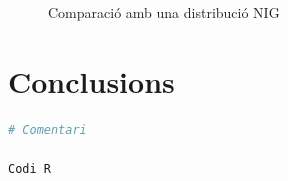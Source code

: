 \documentclass{article}
\numberwithin{table}{section}
\numberwithin{figure}{section}
\numberwithin{equation}{section}
\begin{document}
\begin{figure}[H]
	\centering \sffamily \small
	
	\caption{Comparació amb una distribució NIG}
	\label{fig:comparacio nig}
\end{figure}


\section{Conclusions}
\newpage







\begin{lstlisting}[language=R]
# Comentari

Codi R
\end{lstlisting}

%
%
\printbibliography[heading = biblio]
\end{document}
